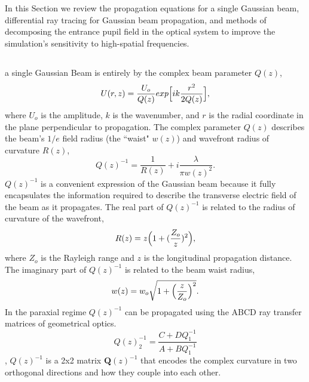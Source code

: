 \section{}
\label{sec:methods}  %

In this Section we review the  propagation equations for a single Gaussian beam,  differential ray tracing  for Gaussian beam propagation, and methods of decomposing the entrance pupil field in the optical system to improve the simulation's sensitivity to high-spatial frequencies. 

\subsection{}
a single Gaussian Beam is  entirely by the complex beam parameter $Q(z)$, \cite{goodman17}
\begin{equation}
	U(r,z) = \frac{U_o}{Q(z)}exp\Bigl[ik\frac{r^2}{2Q(z)}\Bigr],
\end{equation}
where  $U_o$ is the amplitude, $k$ is the wavenumber, and $r$ is the radial coordinate in the plane perpendicular to propagation. The  complex parameter $Q(z)$ describes the beam's $1/e$ field radius (the ``waist" $w(z)$) and wavefront radius of curvature $R(z)$,
\begin{equation}
	Q(z)^{-1} = \frac{1}{R(z)}+i\frac{\lambda}{\pi w(z)^2}.
\end{equation}	
$Q(z)^{-1}$ is a convenient expression of the Gaussian beam because it fully encapsulates the information required to describe the transverse electric field of the beam as it propagates. The real part of $Q(z)^{-1}$ is related to the radius of curvature of the wavefront,
\begin{equation}
    R(z) = z\Bigl(1+(\frac{Z_o}{z})^2\Bigr),
    \label{eq:complex_curvature}
\end{equation}
where $Z_o$ is the Rayleigh range and $z$ is the longitudinal propagation distance.
The imaginary part of $Q(z)^{-1}$ is related to the beam waist radius,
\begin{equation}
	w(z) = w_o\sqrt{1+\Bigl(\frac{z}{Z_o}\Bigr)^2}.
\end{equation}
In the paraxial regime $Q(z)^{-1}$ can be propagated using the ABCD ray transfer matrices of geometrical optics.
\begin{equation}
    Q(z)^{-1}_{2} = \frac{C + DQ_{1}^{-1}}{A + BQ_{1}^{-1}}
    \label{eq:propq}
\end{equation}
, $Q(z)^{-1}$ is a 2x2 matrix $\textbf{Q}(z)^{-1}$ that encodes the complex curvature in two orthogonal directions and how they couple into each other\cite{Ashcraft2020,cai_decentered_nodate}. 

